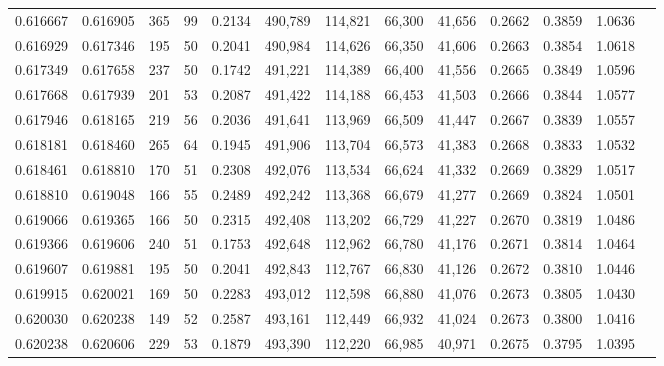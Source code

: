 \begin{tabular}{rrrrrrrrrrrrr}
0.616667 & 0.616905 &    365 &    99 &                                     0.2134 & 490,789 & 114,821 &  66,300 &  41,656 & 0.2662 & 0.3859 & 1.0636 \\
0.616929 & 0.617346 &    195 &    50 &                                     0.2041 & 490,984 & 114,626 &  66,350 &  41,606 & 0.2663 & 0.3854 & 1.0618 \\
0.617349 & 0.617658 &    237 &    50 &                                     0.1742 & 491,221 & 114,389 &  66,400 &  41,556 & 0.2665 & 0.3849 & 1.0596 \\
0.617668 & 0.617939 &    201 &    53 &                                     0.2087 & 491,422 & 114,188 &  66,453 &  41,503 & 0.2666 & 0.3844 & 1.0577 \\
0.617946 & 0.618165 &    219 &    56 &                                     0.2036 & 491,641 & 113,969 &  66,509 &  41,447 & 0.2667 & 0.3839 & 1.0557 \\
0.618181 & 0.618460 &    265 &    64 &                                     0.1945 & 491,906 & 113,704 &  66,573 &  41,383 & 0.2668 & 0.3833 & 1.0532 \\
0.618461 & 0.618810 &    170 &    51 &                                     0.2308 & 492,076 & 113,534 &  66,624 &  41,332 & 0.2669 & 0.3829 & 1.0517 \\
0.618810 & 0.619048 &    166 &    55 &                                     0.2489 & 492,242 & 113,368 &  66,679 &  41,277 & 0.2669 & 0.3824 & 1.0501 \\
0.619066 & 0.619365 &    166 &    50 &                                     0.2315 & 492,408 & 113,202 &  66,729 &  41,227 & 0.2670 & 0.3819 & 1.0486 \\
0.619366 & 0.619606 &    240 &    51 &                                     0.1753 & 492,648 & 112,962 &  66,780 &  41,176 & 0.2671 & 0.3814 & 1.0464 \\
0.619607 & 0.619881 &    195 &    50 &                                     0.2041 & 492,843 & 112,767 &  66,830 &  41,126 & 0.2672 & 0.3810 & 1.0446 \\
0.619915 & 0.620021 &    169 &    50 &                                     0.2283 & 493,012 & 112,598 &  66,880 &  41,076 & 0.2673 & 0.3805 & 1.0430 \\
0.620030 & 0.620238 &    149 &    52 &                                     0.2587 & 493,161 & 112,449 &  66,932 &  41,024 & 0.2673 & 0.3800 & 1.0416 \\
0.620238 & 0.620606 &    229 &    53 &                                     0.1879 & 493,390 & 112,220 &  66,985 &  40,971 & 0.2675 & 0.3795 & 1.0395 \\

\end{tabular}

